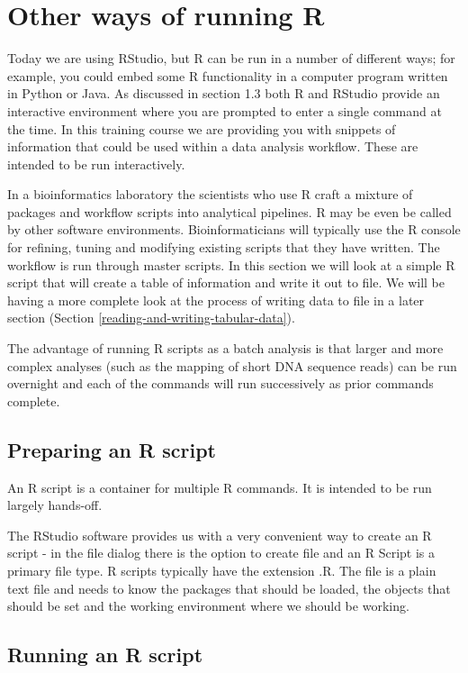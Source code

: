 \documentclass[a4paper]{book}
\begin{document}
\section{Other ways of running R}\label{other-ways-of-running-r}

Today we are using RStudio, but R can be run in a number of different
ways; for example, you could embed some R functionality in a computer
program written in Python or Java. As discussed in section 1.3 both R
and RStudio provide an interactive environment where you are prompted to
enter a single command at the time. In this training course we are
providing you with snippets of information that could be used within a
data analysis workflow. These are intended to be run interactively.

In a bioinformatics laboratory the scientists who use R craft a mixture
of packages and workflow scripts into analytical pipelines. R may be
even be called by other software environments. Bioinformaticians will
typically use the R console for refining, tuning and modifying existing
scripts that they have written. The workflow is run through master
scripts. In this section we will look at a simple R script that will
create a table of information and write it out to file. We will be
having a more complete look at the process of writing data to file in a
later section (Section \ref{reading-and-writing-tabular-data}).

The advantage of running R scripts as a batch analysis is that larger
and more complex analyses (such as the mapping of short DNA sequence
reads) can be run overnight and each of the commands will run
successively as prior commands complete.

\subsection{Preparing an R script}\label{preparing-an-r-script}

An R script is a container for multiple R commands. It is intended to be
run largely hands-off.

The RStudio software provides us with a very convenient way to create an
R script - in the file dialog there is the option to create file and an
R Script is a primary file type. R scripts typically have the extension
.R. The file is a plain text file and needs to know the packages that
should be loaded, the objects that should be set and the working
environment where we should be working.

\subsection{Running an R script}\label{running-an-r-script}
\end{document}
